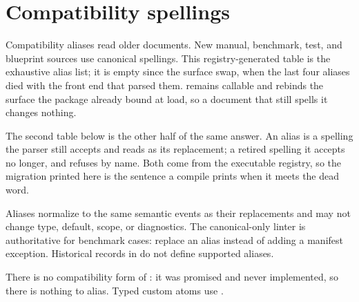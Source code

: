 \section{Compatibility spellings}\label{ch:compatibility}

Compatibility aliases read older documents.  New manual, benchmark, test, and
blueprint sources use canonical spellings.  This registry-generated table is
the exhaustive alias list; it is empty since the surface swap, when the last
four aliases died with the front end that parsed them.  
remains callable and rebinds the surface the package already bound at load,
so a document that still spells it changes nothing.

The second table below is the other half of the same answer.  An alias is a
spelling the parser still accepts and reads as its replacement; a retired
spelling it accepts no longer, and refuses by name.  Both come from the
executable registry, so the migration printed here is the sentence a compile
prints when it meets the dead word.


Aliases normalize to the same semantic events as their replacements and may
not change type, default, scope, or diagnostics.  The canonical-only linter is
authoritative for benchmark cases: replace an alias instead of adding a
manifest exception.  Historical records in  do not
define supported aliases.

There is no compatibility form of : it was promised and
never implemented, so there is nothing to alias.  Typed custom atoms use
.
